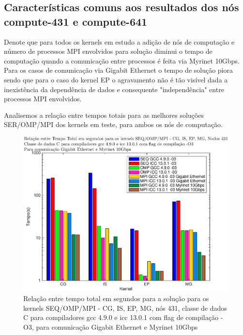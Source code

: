 \documentclass[conference,compsoc]{IEEEtran}
\begin{document}
\subsection{Características comuns aos resultados dos nós compute-431 e compute-641}

Denote que para todos os kernels em estudo a adição de nós de computação e número de processos MPI envolvidos para solução diminui o tempo de computação quando a comunicação entre processos é feita via Myrinet 10Gbps. Para os casos de comunicação via Gigabit Ethernet o tempo de solução piora sendo que para o caso do kernel EP o agravamento não é tão visível dada a inexistência da dependência de dados e consequente "independência" entre processos MPI envolvidos. \par 
Analisemos a relação entre tempos totais para as melhores soluções SER/OMP/MPI dos kernels em teste, para ambos os nós de computação.

\begin{figure}[H]
\centering
\includegraphics[width=1.1\columnwidth]{EPS/MPI/431/TIME_seq_vs_mpi_omp-gcc_vs_icc_431.eps}
\caption{Relação entre tempo total em segundos para a solução para os kernels SEQ/OMP/MPI - CG, IS, EP, MG, nós 431, classe de dados C para compiladores gcc 4.9.0 e icc 13.0.1 com flag de compilação  -O3, para comunicação Gigabit Ethernet e Myrinet 10Gbps}
\label{tempos_431}
\end{figure}
\end{document}
